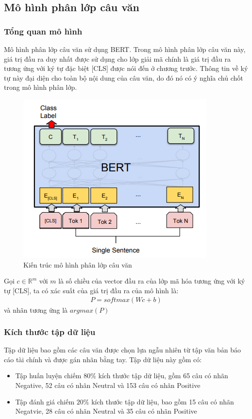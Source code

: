 \documentclass[14pt]{extreport}
\begin{document}
\subsection{Mô hình phân lớp câu văn}
\subsubsection{Tổng quan mô hình}
Mô hình phân lớp câu văn sử dụng BERT. Trong mô hình phân lớp câu văn này, giá trị đầu ra duy nhất được sử dụng cho lớp giải mã chính là giá trị đầu ra tương ứng với ký tự đặc biệt [CLS] được nói đến ở chương trước. Thông tin về ký tự này đại diện cho toàn bộ nội dung của câu văn, do đó nó có ý nghĩa chủ chốt trong mô hình phân lớp.
\begin{figure}
    \centering
    \includegraphics[scale=1.5]{image/bert_cls.png}
    \caption{Kiến trúc mô hình phân lớp câu văn}
    \label{fig:bert_cls}
\end{figure}
Gọi $c \in \mathbb{R}^{m}$ với $m$ là số chiều của vector đầu ra của lớp mã hóa tương ứng với ký tự [CLS], ta có xác suất của giá trị đầu ra của mô hình là:
\begin{align}
    P=softmax( Wc+b)
\end{align}
và nhãn tương ứng là $argmax(P)$
\subsubsection{Kích thước tập dữ liệu}
Tập dữ liệu bao gồm các câu văn được chọn lựa ngẫu nhiên từ tập văn bản báo cáo tài chính và được gán nhãn bằng tay. Tập dữ liệu này gồm có:
\begin{itemize}
    \item Tập huấn luyện chiếm $80\%$ kích thước tập dữ liệu, gồm 65 câu có nhãn Negative, 52 câu có nhãn Neutral và 153 câu có nhãn Positive
    \item Tập đánh giá chiếm $20\%$ kích thước tập dữ liệu, bao gồm 15 câu có nhãn Negatvie, 28 câu có nhãn Neutral và 35 câu có nhãn Positive
\end{itemize}
\end{document}
